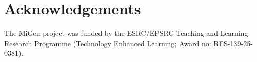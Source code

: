\documentclass[authoryear,preprint,12pt]{elsarticle}
\begin{document}












% 


\section*{Acknowledgements} 

The MiGen project was funded by the ESRC/EPSRC Teaching and
Learning Research Programme (Technology Enhanced Learning; Award no:
RES-139-25-0381).




\end{document}
